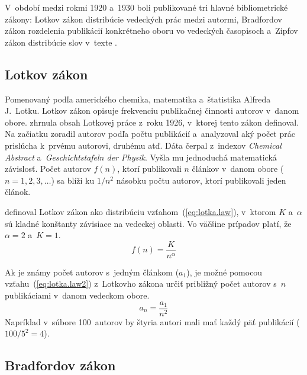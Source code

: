 V~období medzi rokmi 1920 a~1930 boli publikované tri hlavné bibliometrické
zákony: Lotkov zákon distribúcie vedeckých prác medzi autormi, Bradfordov zákon
rozdelenia publikácií konkrétneho oboru vo vedeckých časopisoch a~Zipfov
zákon distribúcie
slov v~texte \citep{Bellis2009}.


\subsection{Lotkov zákon}

Pomenovaný podľa amerického chemika, matematika a~štatistika Alfreda J.~Lotku.
Lotkov zákon opisuje frekvenciu publikačnej činnosti autorov v~danom obore.
\citet{Ondrisova2011} zhrnula obsah Lotkovej práce z~roku 1926, v~ktorej
tento zákon definoval.  Na začiatku zoradil autorov podľa počtu publikácií
a~analyzoval aký počet prác prislúcha k~prvému autorovi, druhému atď.  Dáta čerpal
z~indexov \emph{Chemical Abstract} a~\emph{Geschichtstafeln der Physik}.  Vyšla
mu jednoduchá matematická závislosť.  Počet autorov $f(n)$, ktorí publikovali
$n$ článkov v~danom obore ($n = 1, 2, 3, \dots$) sa blíži ku $1/n^2$ násobku
počtu autorov, ktorí publikovali jeden článok.

\citet{Egghe2005} definoval Lotkov zákon ako distribúciu
vzťahom~(\ref{eq:lotka.law}), v~ktorom $K$ a~$\alpha$ sú kladné konštanty
závisiace na vedeckej oblasti.  Vo väčšine prípadov platí, že $\alpha = 2$
a~$K = 1$.
\begin{equation}
\label{eq:lotka.law}
f(n) = \frac{K}{n^\alpha}
\end{equation}

Ak je známy počet autorov s~jedným článkom ($a_1$), je možné pomocou
vzťahu~(\ref{eq:lotka.law2}) z~Lotkovho zákona určiť približný počet autorov
s~$n$ publikáciami v~danom vedeckom obore.
\begin{equation}
\label{eq:lotka.law2}
a_n = \frac{a_1}{n^2}
\end{equation}
Napríklad v~súbore 100~autorov by štyria autori mali mať každý päť publikácií
($100/5^2 = 4$).


\subsection{Bradfordov zákon}


